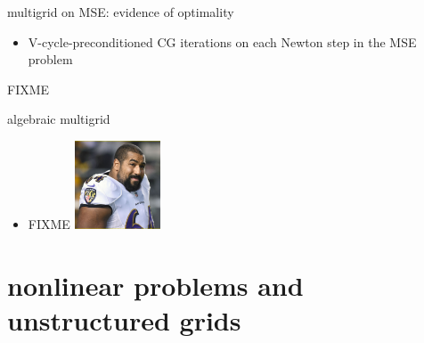 \documentclass[hide notes,intlimits,usenames,dvipsnames]{beamer}
\begin{document}
\begin{frame}{multigrid on MSE: evidence of optimality}
\begin{itemize}
\item V-cycle-preconditioned CG iterations on each Newton step in the MSE problem
\end{itemize}

\begin{center}

\small FIXME
\end{center}
\end{frame}

\begin{frame}{algebraic multigrid}
\begin{itemize}
\item FIXME   \includegraphics[width=0.2\textwidth]{figs/urschel}
\end{itemize}
\end{frame}



\section{nonlinear problems and unstructured grids}
\end{document}
